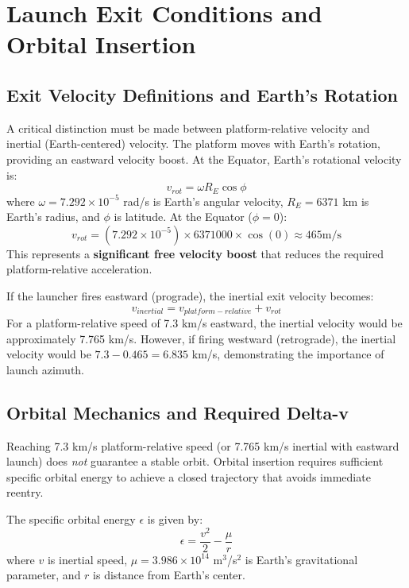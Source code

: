 \section{Launch Exit Conditions and Orbital Insertion}
\label{sec:exit}

\subsection{Exit Velocity Definitions and Earth's Rotation}
A critical distinction must be made between platform-relative velocity and inertial (Earth-centered) velocity. The platform moves with Earth's rotation, providing an eastward velocity boost. At the Equator, Earth's rotational velocity is:
\begin{equation}
v_{rot} = \omega R_E \cos\phi
\end{equation}
where $\omega = 7.292 \times 10^{-5}$ rad/s is Earth's angular velocity, $R_E = 6371$ km is Earth's radius, and $\phi$ is latitude. At the Equator ($\phi = 0$):
\begin{equation}
v_{rot} = (7.292 \times 10^{-5}) \times 6371000 \times \cos(0) \approx 465  \text{m/s}
\end{equation}
This represents a \textbf{significant free velocity boost} that reduces the required platform-relative acceleration.

If the launcher fires eastward (prograde), the inertial exit velocity becomes:
\begin{equation}
v_{inertial} = v_{platform-relative} + v_{rot}
\end{equation}
For a platform-relative speed of 7.3 km/s eastward, the inertial velocity would be approximately 7.765 km/s. However, if firing westward (retrograde), the inertial velocity would be $7.3 - 0.465 = 6.835$ km/s, demonstrating the importance of launch azimuth.

\subsection{Orbital Mechanics and Required Delta-v}
Reaching 7.3 km/s platform-relative speed (or 7.765 km/s inertial with eastward launch) does \emph{not} guarantee a stable orbit. Orbital insertion requires sufficient specific orbital energy to achieve a closed trajectory that avoids immediate reentry.

The specific orbital energy $\epsilon$ is given by:
\begin{equation}
\epsilon = \frac{v^2}{2} - \frac{\mu}{r}
\end{equation}
where $v$ is inertial speed, $\mu = 3.986 \times 10^{14}$ m$^3$/s$^2$ is Earth's gravitational parameter, and $r$ is distance from Earth's center.

